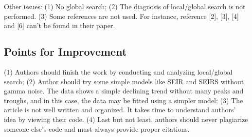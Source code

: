 \documentclass[12pt]{article}
\begin{document}
Other issues: (1) No global search; (2) The diagnosis of local/global search is not performed. (3) Some references are not used. For instance, reference [2], [3], [4] and [6] can't be found in their paper.


\subsection{Points for Improvement}

(1) Authors should finish the work by conducting and analyzing local/global search; (2) Author should try some simple models like SEIR and SEIRS without gamma noise. The data shows a simple declining trend without many peaks and troughs, and in this case, the data may be fitted using a simpler model; (3) The article is not well written and organized. It takes time to understand authors' idea by viewing their code. (4) Last but not least, authors should never plagiarize someone else's code and must always provide proper citations.



\end{document}
